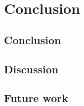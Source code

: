 \chapter{Conclusion}
\label{ch:conclusion}

\section{Conclusion}

\section{Discussion}

\section{Future work}
